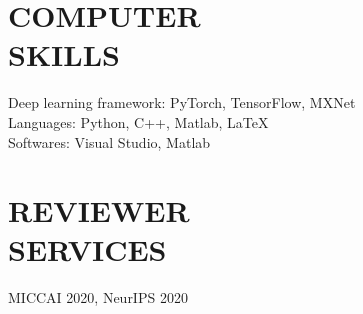\documentclass[margin]{res}
\begin{document}
\begin{resume}
\section{COMPUTER \\ SKILLS} 
                Deep learning framework: PyTorch, TensorFlow, MXNet\\
                Languages: Python, C++, Matlab, \LaTeX \\
                Softwares: Visual Studio, Matlab 

\section{REVIEWER \\ SERVICES}
                MICCAI 2020, NeurIPS 2020

\end{resume}
\end{document}
